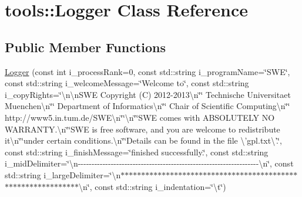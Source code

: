 \hypertarget{classtools_1_1Logger}{\section{tools\-:\-:Logger Class Reference}
\label{classtools_1_1Logger}
}
\subsection*{Public Member Functions}
\begin{DoxyCompactItemize}
\item 
\hyperlink{classtools_1_1Logger_a9e1e0651776fcc78f89a1a1dcf339249}{Logger} (const int i\-\_\-process\-Rank=0, const std\-::string i\-\_\-program\-Name=\char`\"{}S\-W\-E\char`\"{}, const std\-::string i\-\_\-welcome\-Message=\char`\"{}Welcome to\char`\"{}, const std\-::string i\-\_\-copy\-Rights=\char`\"{}\textbackslash{}n\textbackslash{}n\-S\-W\-E Copyright (C) 2012-\/2013\textbackslash{}n\char`\"{}\char`\"{}  Technische Universitaet Muenchen\textbackslash{}n\char`\"{}\char`\"{}  Department of Informatics\textbackslash{}n\char`\"{}\char`\"{}  Chair of Scientific Computing\textbackslash{}n\char`\"{}\char`\"{}  http\-://www5.\-in.\-tum.\-de/S\-W\-E\textbackslash{}n\char`\"{}\char`\"{}\textbackslash{}n\char`\"{}\char`\"{}S\-W\-E comes with A\-B\-S\-O\-L\-U\-T\-E\-L\-Y N\-O W\-A\-R\-R\-A\-N\-T\-Y.\textbackslash{}n\char`\"{}\char`\"{}S\-W\-E is free software, and you are welcome to redistribute it\textbackslash{}n\char`\"{}\char`\"{}under certain conditions.\textbackslash{}n\char`\"{}\char`\"{}Details can be found in the file \textbackslash{}'gpl.\-txt\textbackslash{}'.\char`\"{}, const std\-::string i\-\_\-finish\-Message=\char`\"{}finished successfully.\char`\"{}, const std\-::string i\-\_\-mid\-Delimiter=\char`\"{}\textbackslash{}n-\/-\/-\/-\/-\/-\/-\/-\/-\/-\/-\/-\/-\/-\/-\/-\/-\/-\/-\/-\/-\/-\/-\/-\/-\/-\/-\/-\/-\/-\/-\/-\/-\/-\/-\/-\/-\/-\/-\/-\/-\/-\/-\/-\/-\/-\/-\/-\/-\/-\/-\/-\/-\/-\/-\/-\/-\/-\/-\/-\/-\/-\/-\/-\/-\/-\/\textbackslash{}n\char`\"{}, const std\-::string i\-\_\-large\-Delimiter=\char`\"{}\textbackslash{}n$\ast$$\ast$$\ast$$\ast$$\ast$$\ast$$\ast$$\ast$$\ast$$\ast$$\ast$$\ast$$\ast$$\ast$$\ast$$\ast$$\ast$$\ast$$\ast$$\ast$$\ast$$\ast$$\ast$$\ast$$\ast$$\ast$$\ast$$\ast$$\ast$$\ast$$\ast$$\ast$$\ast$$\ast$$\ast$$\ast$$\ast$$\ast$$\ast$$\ast$$\ast$$\ast$$\ast$$\ast$$\ast$$\ast$$\ast$$\ast$$\ast$$\ast$$\ast$$\ast$$\ast$$\ast$$\ast$$\ast$$\ast$$\ast$$\ast$$\ast$$\ast$\textbackslash{}n\char`\"{}, const std\-::string i\-\_\-indentation=\char`\"{}\textbackslash{}t\char`\"{})

\end{DoxyCompactItemize}
